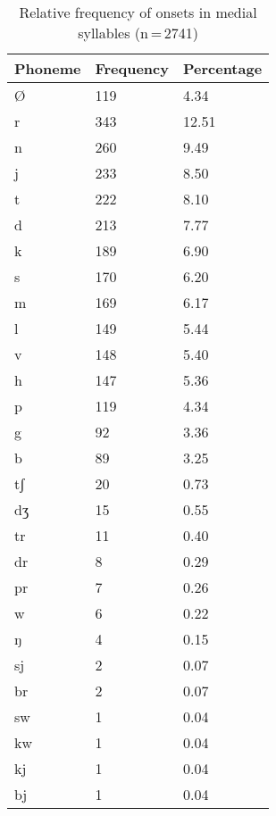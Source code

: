 \begin{table}[hp]\centering
\caption[Relative frequency of onsets in medial syllables]{Relative frequency of onsets in medial syllables (n\,=\,2741)}
\begin{tabu} to 0.5\textwidth{X X[c] X[c]}
\tableheaderfont\toprule
Phoneme
	& Frequency
	& Percentage
	\\
	
\toprule

Ø
	& 119
	& 4.34\pct
	\\

\midrule

r
	& 343
	& 12.51\pct
	\\
n
	& 260
	& 9.49\pct
	\\
j
	& 233
	& 8.50\pct
	\\
t
	& 222
	& 8.10\pct
	\\
d
	& 213
	& 7.77\pct
	\\
k
	& 189
	& 6.90\pct
	\\
s
	& 170
	& 6.20\pct
	\\
m
	& 169
	& 6.17\pct
	\\
l
	& 149
	& 5.44\pct
	\\
v
	& 148
	& 5.40\pct
	\\
h
	& 147
	& 5.36\pct
	\\
	
p
	& 119
	& 4.34\pct
	\\
g
	& 92
	& 3.36\pct
	\\
b
	& 89
	& 3.25\pct
	\\
tʃ
	& 20
	& 0.73\pct
	\\
dʒ
	& 15
	& 0.55\pct
	\\
tr
	& 11
	& 0.40\pct
	\\
dr
	& 8
	& 0.29\pct
	\\
pr
	& 7
	& 0.26\pct
	\\
w
	& 6
	& 0.22\pct
	\\
ŋ
	& 4
	& 0.15\pct
	\\
sj
	& 2
	& 0.07\pct
	\\
br
	& 2
	& 0.07\pct
	\\
sw
	& 1
	& 0.04\pct
	\\
kw
	& 1
	& 0.04\pct
	\\
kj
	& 1
	& 0.04\pct
	\\
bj
	& 1
	& 0.04\pct
	\\

\bottomrule
\end{tabu}
\label{tab:midon}
\end{table}

